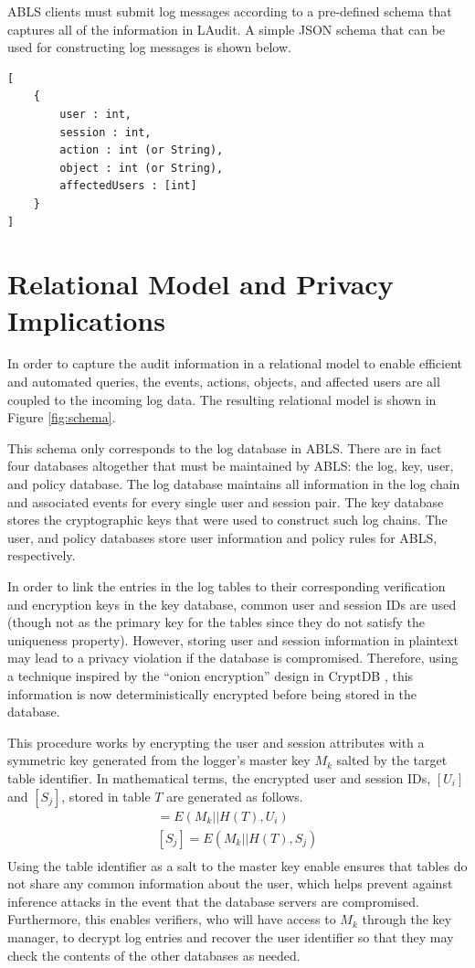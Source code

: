 \documentclass{sig-alternate}
\begin{document}
ABLS clients must submit log messages according to a pre-defined schema that captures
all of the information in LAudit. A simple JSON schema that can be used for constructing log messages 
is shown below.

\begin{lstlisting}
[
    {
        user : int,
        session : int,
        action : int (or String),
        object : int (or String),
        affectedUsers : [int]
    }
]
\end{lstlisting}

\section{Relational Model and Privacy Implications}
\label{sec:model}
In order to capture the audit information in a relational model to enable efficient and automated queries, 
the events, actions, objects, and affected users are all coupled to the incoming log data. The resulting relational
model is shown in Figure \ref{fig:schema}.

This schema only corresponds to the log database in ABLS. There are in fact four databases altogether that must be maintained by ABLS:
the log, key, user, and policy database. The log database maintains all information in the 
log chain and associated events for every 
single user and session pair. The key database stores the cryptographic keys that were used to construct
such log chains. The user, and policy databases store user information and policy rules for ABLS, respectively. 

In order to link the entries in the log tables to their corresponding verification and encryption keys in the key database,
common user and session IDs are used (though not as the primary key for the tables since they do not satisfy
the uniqueness property). However, storing user and session information in plaintext may lead to a privacy violation
if the database is compromised. Therefore, using a technique inspired by the ``onion encryption'' design in
CryptDB \cite{Popa2012-CryptDB}, this information is now deterministically encrypted before being stored in the database.

This procedure works by encrypting the user and session attributes with a symmetric key generated
from the logger's master key $M_k$ salted by the target table identifier. In mathematical
terms, the encrypted user and session IDs, $[U_i]$ and $[S_j]$, stored in table $T$ are generated as follows.
\begin{align*}
[U_i] = E(M_k || H(T), U_i) \\
[S_j] = E(M_k || H(T), S_j) \\
\end{align*}
Using the table identifier as a salt to the master key 
enable ensures that tables do not share any common information about the user, which helps prevent against 
inference attacks in the event that the database servers are compromised. Furthermore, this enables verifiers,
who will have access to $M_k$ through the key manager, to decrypt log entries and recover the user identifier 
so that they may check the contents of the other databases as needed.
\end{document}

